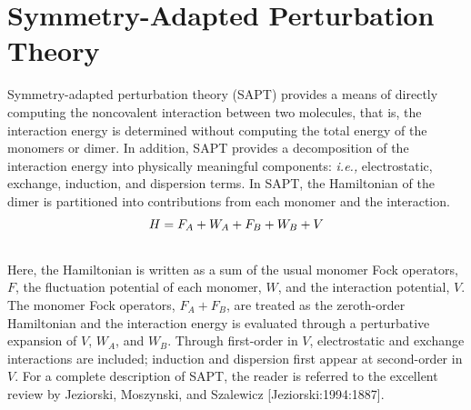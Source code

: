 \documentclass[letterpaper,10pt,english]{sphinxmanual}
\begin{document}
\chapter{Symmetry-Adapted Perturbation Theory}
\label{index:symmetry-adapted-perturbation-theory}
Symmetry-adapted perturbation theory (SAPT) provides a means of directly
computing the noncovalent interaction between two molecules, that is, the
interaction energy is determined without computing the total energy of the
monomers or dimer. In addition, SAPT provides a decomposition of the
interaction energy into physically meaningful components: \emph{i.e.,}
electrostatic, exchange, induction, and dispersion terms. In SAPT, the
Hamiltonian of the dimer is partitioned into contributions from each
monomer and the interaction.
\begin{gather}
\begin{split}H=F_A+W_A+F_B+W_B+V\end{split}\notag\\\begin{split}\end{split}\notag
\end{gather}
Here, the Hamiltonian is written as a sum of the usual monomer Fock
operators, $F$, the fluctuation potential of each monomer, $W$, and the
interaction potential, $V$. The monomer Fock operators, $F_A+F_B$, are
treated as the zeroth-order Hamiltonian and the interaction energy is
evaluated through a perturbative expansion of $V$, $W_A$, and $W_B$.
Through first-order in $V$, electrostatic and exchange interactions are
included; induction and dispersion first appear at second-order in $V$. For
a complete description of SAPT, the reader is referred to the excellent
review by Jeziorski, Moszynski, and Szalewicz {[}Jeziorski:1994:1887{]}.
\end{document}
